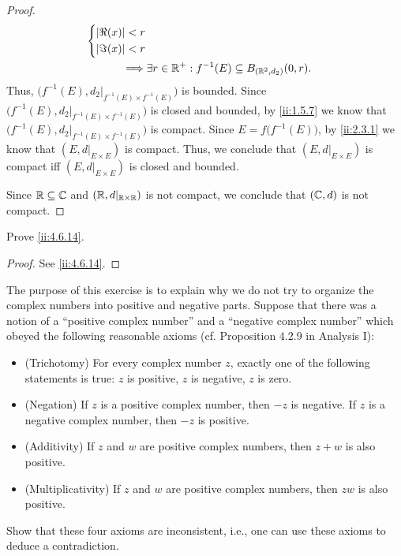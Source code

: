 \begin{proof}
\begin{align*}
\begin{dcases}
                                                       \left\lvert\Re(x)\right\rvert < r \\
                                                       \left\lvert\Im(x)\right\rvert < r
                                                     \end{dcases}                                                       \\
    \implies & \exists r \in \mathbb{R}^+ : f^{-1}(E) \subseteq B_{(\mathbb{R}^2, d_2)}(0, r).
  \end{align*}
  Thus, \(\big(f^{-1}(E), d_2|_{f^{-1}(E) \times f^{-1}(E)}\big)\) is bounded.
  Since \(\big(f^{-1}(E), d_2|_{f^{-1}(E) \times f^{-1}(E)}\big)\) is closed and bounded, by \cref{ii:1.5.7} we know that \(\big(f^{-1}(E), d_2|_{f^{-1}(E) \times f^{-1}(E)}\big)\) is compact.
  Since \(E = f\big(f^{-1}(E)\big)\), by \cref{ii:2.3.1} we know that \((E, d|_{E \times E})\) is compact.
  Thus, we conclude that \((E, d|_{E \times E})\) is compact iff \((E, d|_{E \times E})\) is closed and bounded.

  Since \(\mathbb{R} \subseteq \mathbb{C}\) and \((\mathbb{R}, d|_{\mathbb{R} \times \mathbb{R}})\) is not compact, we conclude that \((\mathbb{C}, d)\) is not compact.
\end{proof}

\begin{ex}\label{ii:ex:4.6.14}
  Prove \cref{ii:4.6.14}.
\end{ex}

\begin{proof}
  See \cref{ii:4.6.14}.
\end{proof}

\begin{ex}\label{ii:ex:4.6.15}
  The purpose of this exercise is to explain why we do not try to organize the complex numbers into positive and negative parts.
  Suppose that there was a notion of a ``positive complex number'' and a ``negative complex number'' which obeyed the following reasonable axioms (cf. Proposition 4.2.9 in Analysis I):
  \begin{itemize}
    \item (Trichotomy)
          For every complex number \(z\), exactly one of the following statements is true:
          \(z\) is positive, \(z\) is negative, \(z\) is zero.
    \item (Negation)
          If \(z\) is a positive complex number, then \(-z\) is negative.
          If \(z\) is a negative complex number, then \(-z\) is positive.
    \item (Additivity)
          If \(z\) and \(w\) are positive complex numbers, then \(z + w\) is also positive.
    \item (Multiplicativity)
          If \(z\) and \(w\) are positive complex numbers, then \(zw\) is also positive.
  \end{itemize}
  Show that these four axioms are inconsistent, i.e., one can use these axioms to deduce a contradiction.
\end{ex}

